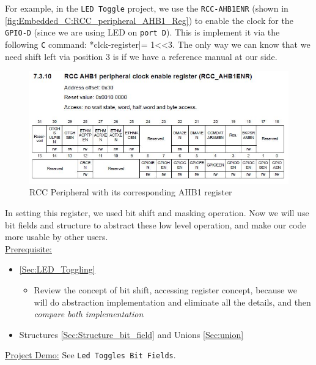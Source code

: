 For example, in the \verb|LED Toggle| project, we use the \verb|RCC-AHB1ENR| (shown in \autoref{fig:Embedded_C:RCC_peripheral_AHB1_Reg}) to enable the clock for the \verb|GPIO-D| (since we are using LED on \verb|port D|). This is implement it via the following \verb|C| command: *clck-register|=  1<<3. The only way we can know that we need shift left via position 3 is if we have a reference manual at our side.


\begin{figure}[h]
\centering
\includegraphics[scale=0.55]{Figures/Embedded_C/RCC_peripheral_AHB1_Reg}
\caption{RCC Peripheral with its corresponding AHB1 register}
\label{fig:Embedded_C:RCC_peripheral_AHB1_Reg}
\end{figure}

In setting this register, we used bit shift and masking operation. Now we will use bit fields and structure to abstract these low level operation, and make our code more usable by other users.\\

\underline{Prerequisite:}

\begin{itemize}
    \item \autoref{Sec:LED_Toggling}
    
    \begin{itemize}
        \item Review the concept of bit shift, accessing register concept, because we will do abstraction implementation and eliminate all the details, and then \textit{compare both implementation}
    \end{itemize}
    
    \item Structures \autoref{Sec:Structure_bit_field} and Unions \autoref{Sec:union}
    
\end{itemize}


\underline{Project Demo:} See \verb|Led Toggles Bit Fields|.\\

